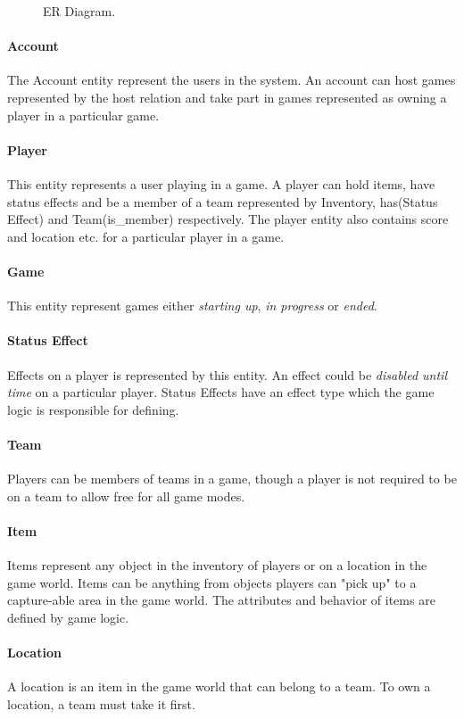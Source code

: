 \begin{figure}
  \centering
    
  \caption{ER Diagram.}
  \label{fig:ER}
\end{figure}




\paragraph{Account}
The Account entity represent the users in the system. An account can host games represented by the host relation and take part in games represented as owning a player in a particular game.

\paragraph{Player}
This entity represents a user playing in a game. A player can hold items, have status effects and be a member of a team represented by Inventory, has(Status Effect) and Team(is\_member) respectively. The player entity also contains score and location etc. for a particular player in a game.

\paragraph{Game}
This entity represent games either \textit{starting up}, \textit{in progress} or \textit{ended}.

\paragraph{Status Effect}
Effects on a player is represented by this entity. An effect could be \textit{disabled until time} on a particular player. Status Effects have an effect type which the game logic is responsible for defining.

\paragraph{Team}
Players can be members of teams in a game, though a player is not required to be on a team to allow free for all game modes.

\paragraph{Item}
Items represent any object in the inventory of players or on a location in the game world. Items can be anything from objects players can "pick up" to a capture-able area in the game world. The attributes and behavior of items are defined by game logic.

\paragraph{Location}
A location is an item in the game world that can belong to a team. To own a location, a team must take it first.



